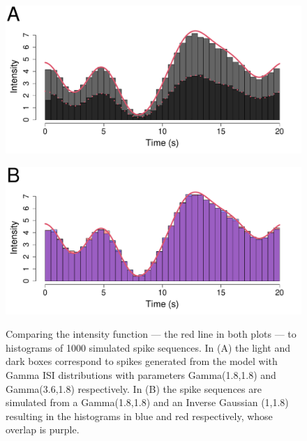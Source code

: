\documentclass[oneside, 12 pt]{book}
\begin{document}

     \begin{figure}[t]
    \begin{center}
	\begin{subfloat}{
	\includegraphics[width = 0.68\linewidth]{CompareHist}}
	\end{subfloat}
	\begin{subfloat}{
	\includegraphics[width = 0.68\linewidth]{CompareHist_Dist}}
	\end{subfloat}	
		\caption{Comparing the intensity function --- the red line in both plots --- to histograms of 1000 simulated spike sequences. In (A) the light and dark boxes correspond to spikes generated from the model with Gamma ISI distributions with parameters Gamma(1.8,1.8) and Gamma(3.6,1.8) respectively. In (B) the spike sequences are simulated from a Gamma(1.8,1.8) and an Inverse Gaussian (1,1.8) resulting in the histograms in blue and red respectively, whose overlap is purple.  }
\label{fig:CompareHist}
\end{center}
\end{figure}
\end{document}
